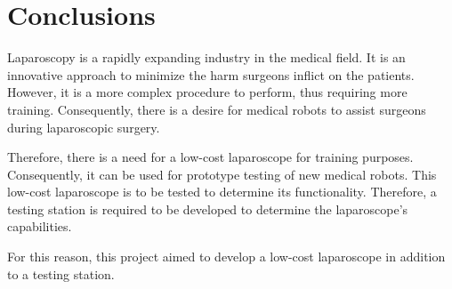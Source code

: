 \chapter{Conclusions}
\label{sec:Conclusion}



Laparoscopy is a rapidly expanding industry in the medical field. It is an innovative approach to minimize the harm surgeons inflict on the patients. However, it is a more complex procedure to perform, thus requiring more training. Consequently, there is a desire for medical robots to assist surgeons during laparoscopic surgery.


Therefore, there is a need for a low-cost laparoscope for training purposes. Consequently, it can be used for prototype testing of new medical robots. This low-cost laparoscope is to be tested to determine its functionality. Therefore, a testing station is required to be developed to determine the laparoscope's capabilities.


For this reason, this project aimed to develop a low-cost laparoscope in addition to a testing station.